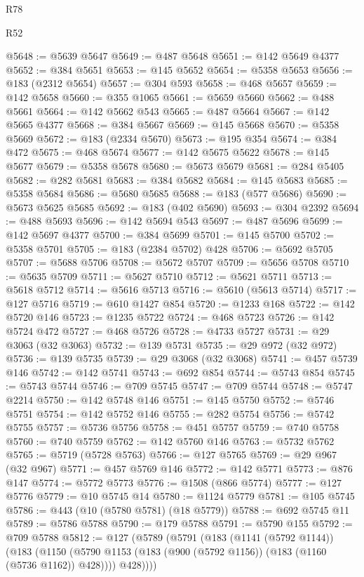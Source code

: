 \begin{lexlean}{R78}
\begin{lexlean}{R52}
\begin{coremodule}
{{{{{{{{{{{{{{{{{{{{{{{{{{{{{{{{{{{{{{{{{{{{{{{{{{{{{{{{{{{{{{{{{{{{{{{{{{{{{{{{{{{{{{{{{{{{{{{{{{{{{{{{{{{{{{{{{{{{{{{{{{{{{{{{{{{{{{{{{{{{{{{{{{{{{{{{{{{{{{{{{{{{{{{{{{{{{{{{{{{{{{{{{{{{{{{{{{{{{{@5648 := @5639 @5647
@5649 := @487 @5648
@5651 := @142 @5649 @4377
@5652 := @384 @5651
@5653 := @145 @5652
@5654 := @5358 @5653
@5656 := @183 (@2312 @5654)
@5657 := @304 @593
@5658 := @468 @5657
@5659 := @142 @5658
@5660 := @355 @1065
@5661 := @5659 @5660
@5662 := @488 @5661
@5664 := @142 @5662 @543
@5665 := @487 @5664
@5667 := @142 @5665 @4377
@5668 := @384 @5667
@5669 := @145 @5668
@5670 := @5358 @5669
@5672 := @183 (@2334 @5670)
@5673 := @195 @354
@5674 := @384 @472
@5675 := @468 @5674
@5677 := @142 @5675 @5622
@5678 := @145 @5677
@5679 := @5358 @5678
@5680 := @5673 @5679
@5681 := @284 @5405
@5682 := @282 @5681
@5683 := @384 @5682
@5684 := @145 @5683
@5685 := @5358 @5684
@5686 := @5680 @5685
@5688 := @183 (@577 @5686)
@5690 := @5673 @5625 @5685
@5692 := @183 (@402 @5690)
@5693 := @304 @2392
@5694 := @488 @5693
@5696 := @142 @5694 @543
@5697 := @487 @5696
@5699 := @142 @5697 @4377
@5700 := @384 @5699
@5701 := @145 @5700
@5702 := @5358 @5701
@5705 := @183 (@2384 @5702) @428
@5706 := @5692 @5705
@5707 := @5688 @5706
@5708 := @5672 @5707
@5709 := @5656 @5708
@5710 := @5635 @5709
@5711 := @5627 @5710
@5712 := @5621 @5711
@5713 := @5618 @5712
@5714 := @5616 @5713
@5716 := @5610 (@5613 @5714)
@5717 := @127 @5716
@5719 := @610 @1427 @854
@5720 := @1233 @168
@5722 := @142 @5720 @146
@5723 := @1235 @5722
@5724 := @468 @5723
@5726 := @142 @5724 @472
@5727 := @468 @5726
@5728 := @4733 @5727
@5731 := @29 @3063 (@32 @3063)
@5732 := @139 @5731
@5735 := @29 @972 (@32 @972)
@5736 := @139 @5735
@5739 := @29 @3068 (@32 @3068)
@5741 := @457 @5739 @146
@5742 := @142 @5741
@5743 := @692 @854
@5744 := @5743 @854
@5745 := @5743 @5744
@5746 := @709 @5745
@5747 := @709 @5744
@5748 := @5747 @2214
@5750 := @142 @5748 @146
@5751 := @145 @5750
@5752 := @5746 @5751
@5754 := @142 @5752 @146
@5755 := @282 @5754
@5756 := @5742 @5755
@5757 := @5736 @5756
@5758 := @451 @5757
@5759 := @740 @5758
@5760 := @740 @5759
@5762 := @142 @5760 @146
@5763 := @5732 @5762
@5765 := @5719 (@5728 @5763)
@5766 := @127 @5765
@5769 := @29 @967 (@32 @967)
@5771 := @457 @5769 @146
@5772 := @142 @5771
@5773 := @876 @147
@5774 := @5772 @5773
@5776 := @1508 (@866 @5774)
@5777 := @127 @5776
@5779 := @10 @5745 @14
@5780 := @1124 @5779
@5781 := @105 @5745
@5786 := @443 (@10 (@5780 @5781) (@18 @5779))
@5788 := @692 @5745 @11
@5789 := @5786 @5788
@5790 := @179 @5788
@5791 := @5790 @155
@5792 := @709 @5788
@5812 := @127
    (@5789
      (@5791
        (@183
          (@1141 (@5792 @1144))
          (@183
            (@1150 (@5790 @1153 (@183 (@900 (@5792 @1156)) (@183 (@1160 (@5736 @1162)) @428))))
            @428))))
}}}}}}}}}}}}}}}}}}}}}}}}}}}}}}}}}}}}}}}}}}}}}}}}}}}}}}}}}}}}}}}}}}}}}}}}}}}}}}}}}}}}}}}}}}}}}}}}}}}}}}}}}}}}}}}}}}}}}}}}}}}}}}}}}}}}}}}}}}}}}}}}}}}}}}}}}}}}}}}}}}}}}}}}}}}}}}}}}}}}}}}}}}}}}}}}}}}}}}
\end{coremodule}
\end{lexlean}
\end{lexlean}
